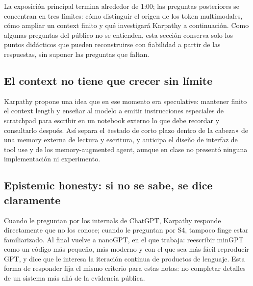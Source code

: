 \documentclass[a4paper]{article}
\begin{document}
La exposición principal termina alrededor de 1:00; las preguntas posteriores se concentran en tres límites: cómo distinguir el origen de los token multimodales, cómo ampliar un context finito y qué investigará Karpathy a continuación. Como algunas preguntas del público no se entienden, esta sección conserva solo los puntos didácticos que pueden reconstruirse con fiabilidad a partir de las respuestas, sin suponer las preguntas que faltan.

\subsection{El context no tiene que crecer sin límite}

Karpathy propone una idea que en ese momento era speculative: mantener finito el context length y enseñar al modelo a emitir instrucciones especiales de scratchpad para escribir en un notebook externo lo que debe recordar y consultarlo después. Así separa el «estado de corto plazo dentro de la cabeza» de una memory externa de lectura y escritura, y anticipa el diseño de interfaz de tool use y de los memory-augmented agent, aunque en clase no presentó ninguna implementación ni experimento.


\subsection{Epistemic honesty: si no se sabe, se dice claramente}

Cuando le preguntan por los internals de ChatGPT, Karpathy responde directamente que no los conoce; cuando le preguntan por S4, tampoco finge estar familiarizado. Al final vuelve a nanoGPT, en el que trabaja: reescribir minGPT como un código más pequeño, más moderno y con el que sea más fácil reproducir GPT, y dice que le interesa la iteración continua de productos de lenguaje. Esta forma de responder fija el mismo criterio para estas notas: no completar detalles de un sistema más allá de la evidencia pública.
\end{document}
